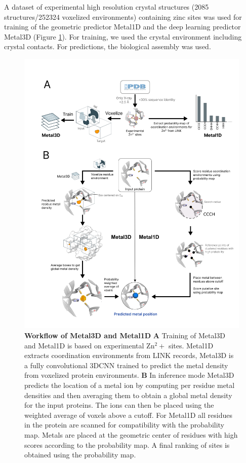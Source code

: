 \documentclass[  ASAPversion,
  ,
  9pt]{elife}
\begin{document}
A dataset of experimental high resolution crystal structures (2085 structures/252324 voxelized environments) containing zinc sites was used for training of the geometric predictor Metal1D and the deep learning predictor Metal3D (Figure \ref{fig:method}). For training, we used the crystal environment including crystal contacts. For predictions, the biological assembly was used.

\begin{figure}
\hypertarget{fig:method}{%
\centering
\includegraphics{images/Metal3D_Metal1D_method.png}
\caption{\textbf{Workflow of Metal3D and Metal1D} \textbf{A} Training of Metal3D and Metal1D is based on experimental Zn$^2+$ sites. Metal1D extracts coordination environments from LINK records, Metal3D is a fully convolutional 3DCNN trained to predict the metal density from voxelized protein environments. \textbf{B} In inference mode Metal3D predicts the location of a metal ion by computing per residue metal densities and then averaging them to obtain a global metal density for the input proteins. The ions can then be placed using the weighted average of voxels above a cutoff. For Metal1D all residues in the protein are scanned for compatibility with the probability map. Metals are placed at the geometric center of residues with high scores according to the probability map. A final ranking of sites is obtained using the probability map.}\label{fig:method}
}
\end{figure}
\end{document}
